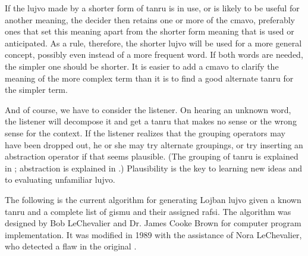 If the lujvo made by a shorter form of tanru is in use, or is likely to be useful for another meaning, the decider then retains one or more of the cmavo, preferably ones that set this meaning apart from the shorter form meaning that is used or anticipated. As a rule, therefore, the shorter lujvo will be used for a more general concept, possibly even instead of a more frequent word. If both words are needed, the simpler one should be shorter. It is easier to add a cmavo to clarify the meaning of the more complex term than it is to find a good alternate tanru for the simpler term.

And of course, we have to consider the listener. On hearing an unknown word, the listener will decompose it and get a tanru that makes no sense or the wrong sense for the context. If the listener realizes that the grouping operators may have been dropped out, he or she may try alternate groupings, or try inserting an abstraction operator if that seems plausible. (The grouping of tanru is explained in ; abstraction is explained in .) Plausibility is the key to learning new ideas and to evaluating unfamiliar lujvo.



The following is the current algorithm for generating Lojban lujvo given a known tanru and a complete list of gismu and their assigned rafsi. The algorithm was designed by Bob LeChevalier and Dr. James Cooke Brown for computer program implementation. It was modified in 1989 with the assistance of Nora LeChevalier, who detected a flaw in the original .

